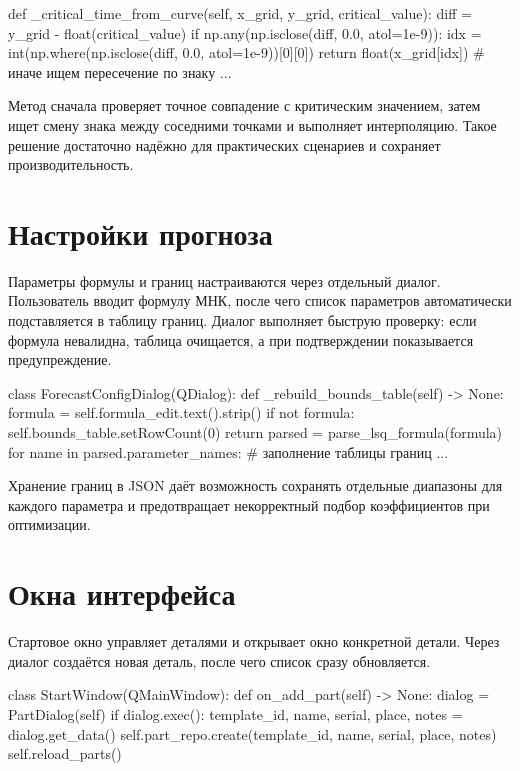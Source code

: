 \documentclass[12pt,a4paper]{article}
\begin{document}
\begin{codeblock}
def _critical_time_from_curve(self, x_grid, y_grid, critical_value):
    diff = y_grid - float(critical_value)
    if np.any(np.isclose(diff, 0.0, atol=1e-9)):
        idx = int(np.where(np.isclose(diff, 0.0, atol=1e-9))[0][0])
        return float(x_grid[idx])
    # иначе ищем пересечение по знаку
    ...
\end{codeblock}
Метод сначала проверяет точное совпадение с критическим значением, затем ищет смену
знака между соседними точками и выполняет интерполяцию. Такое решение достаточно
надёжно для практических сценариев и сохраняет производительность.

\section*{Настройки прогноза}
Параметры формулы и границ настраиваются через отдельный диалог.
Пользователь вводит формулу МНК, после чего список параметров автоматически
подставляется в таблицу границ. Диалог выполняет быструю проверку: если формула
невалидна, таблица очищается, а при подтверждении показывается предупреждение.

\begin{codeblock}
class ForecastConfigDialog(QDialog):
    def _rebuild_bounds_table(self) -> None:
        formula = self.formula_edit.text().strip()
        if not formula:
            self.bounds_table.setRowCount(0)
            return
        parsed = parse_lsq_formula(formula)
        for name in parsed.parameter_names:
            # заполнение таблицы границ
            ...
\end{codeblock}

Хранение границ в JSON даёт возможность сохранять отдельные диапазоны для каждого
параметра и предотвращает некорректный подбор коэффициентов при оптимизации.

\section*{Окна интерфейса}
Стартовое окно управляет деталями и открывает окно конкретной детали.
Через диалог создаётся новая деталь, после чего список сразу обновляется.
\begin{codeblock}
class StartWindow(QMainWindow):
    def on_add_part(self) -> None:
        dialog = PartDialog(self)
        if dialog.exec():
            template_id, name, serial, place, notes = dialog.get_data()
            self.part_repo.create(template_id, name, serial, place, notes)
            self.reload_parts()
\end{codeblock}
\end{document}
